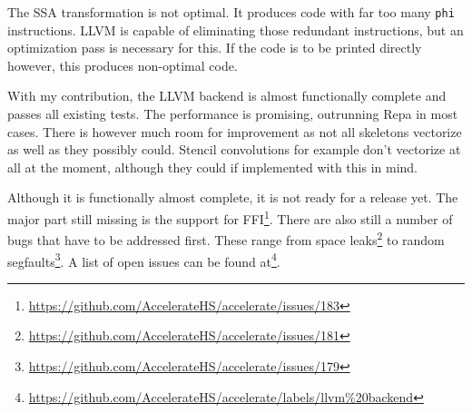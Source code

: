 \documentclass[a4paper,bibliography=totocnumbered,parskip,headsepline]{scrbook}
\begin{document}
The SSA transformation is not optimal.
It produces code with far too many \lstinline!phi! instructions.
LLVM is capable of eliminating those redundant instructions, but an optimization pass is necessary for this.
If the code is to be printed directly however, this produces non-optimal code.

\newpage
With my contribution, the LLVM backend is almost functionally complete and passes all existing tests.
The performance is promising, outrunning Repa in most cases.
There is however much room for improvement as not all skeletons vectorize as well as they possibly could.
Stencil convolutions for example don't vectorize at all at the moment, although they could if implemented with this in mind.

Although it is functionally almost complete, it is not ready for a release yet.
The major part still missing is the support for FFI\footnote{\url{https://github.com/AccelerateHS/accelerate/issues/183}}.
There are also still a number of bugs that have to be addressed first.
These range from space leaks\footnote{\url{https://github.com/AccelerateHS/accelerate/issues/181}} to random segfaults\footnote{\url{https://github.com/AccelerateHS/accelerate/issues/179}}.
A list of open issues can be found at\footnote{\url{https://github.com/AccelerateHS/accelerate/labels/llvm\%20backend}}.


\appendix

\backmatter
\sloppy
\printbibliography[heading=bibintoc]
\end{document}
